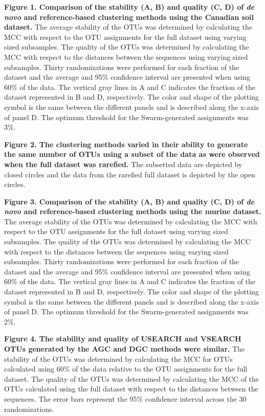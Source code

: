 \documentclass[11pt,]{article}
\begin{document}
\textbf{Figure 1. Comparison of the stability (A, B) and quality (C, D)
of \emph{de novo} and reference-based clustering methods using the
Canadian soil dataset.} The average stability of the OTUs was determined
by calculating the MCC with respect to the OTU assignments for the full
dataset using varying sized subsamples. The quality of the OTUs was
determined by calculating the MCC with respect to the distances between
the sequences using varying sized subsamples. Thirty randomizations were
performed for each fraction of the dataset and the average and 95\%
confidence interval are presented when using 60\% of the data. The
vertical gray lines in A and C indicates the fraction of the dataset
represented in B and D, respectively. The color and shape of the
plotting symbol is the same between the different panels and is
described along the x-axis of panel D. The optimum threshold for the
Swarm-generated assignments was 3\%.

\textbf{Figure 2. The clustering methods varied in their ability to
generate the same number of OTUs using a subset of the data as were
observed when the full dataset was rarefied.} The subsetted data are
depicted by closed circles and the data from the rarefied full dataset
is depicted by the open circles.

\textbf{Figure 3. Comparison of the stability (A, B) and quality (C, D)
of \emph{de novo} and reference-based clustering methods using the
murine dataset.} The average stability of the OTUs was determined by
calculating the MCC with respect to the OTU assignments for the full
dataset using varying sized subsamples. The quality of the OTUs was
determined by calculating the MCC with respect to the distances between
the sequences using varying sized subsamples. Thirty randomizations were
performed for each fraction of the dataset and the average and 95\%
confidence interval are presented when using 60\% of the data. The
vertical gray lines in A and C indicates the fraction of the dataset
represented in B and D, respectively. The color and shape of the
plotting symbol is the same between the different panels and is
described along the x-axis of panel D. The optimum threshold for the
Swarm-generated assignments was 2\%.

\textbf{Figure 4. The stability and quality of USEARCH and VSEARCH OTUs
generated by the AGC and DGC methods were similar.} The stability of the
OTUs was determined by calculating the MCC for OTUs calculated using
60\% of the data relative to the OTU assignments for the full dataset.
The quality of the OTUs was determined by calculating the MCC of the
OTUs calculated using the full dataset with respect to the distances
between the sequences. The error bars represent the 95\% confidence
interval across the 30 randomizations.
\end{document}

